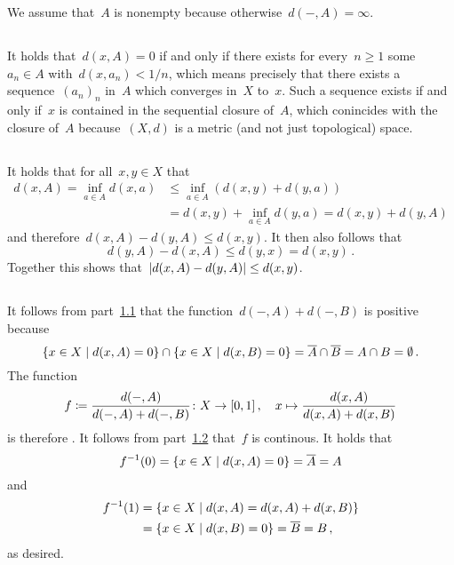 \section{}


We assume that~$A$ is nonempty because otherwise~$d(-,A) = \infty$.



\subsection{}
\label{distance for closed}

It holds that~$d(x,A) = 0$ if and only if there exists for every~$n \geq 1$ some~$a_n \in A$ with~$d(x,a_n) < 1/n$, which means precisely that there exists a sequence~$(a_n)_n$ in~$A$ which converges in~$X$ to~$x$.
Such a sequence exists if and only if~$x$ is contained in the sequential closure of~$A$, which conincides with the closure of~$A$ because~$(X,d)$ is a metric (and not just topological) space.





\subsection{}
\label{distance is lipschitz}

It holds that for all~$x, y \in X$ that
\begin{align*}
          d(x,A)
   =      \inf_{a \in A} d(x,a)
  &\leq   \inf_{a \in A} \left( d(x,y) + d(y,a) \right) \\
  &=      d(x,y) + \inf_{a \in A} d(y,a)
   =      d(x,y) + d(y,A)
\end{align*}
and therefore~$d(x,A) - d(y,A) \leq d(x,y)$.
It then also follows that 
\[
        d(y,A) - d(x,A) 
  \leq  d(y,x)
  =     d(x,y) \,.
\]
Together this shows that~$\lvert d(x,A) - d(y,A) \rvert \leq d(x,y)$.





\subsection{}

It follows from part~\ref{distance for closed} that the function~$d(-,A) + d(-,B)$ is positive because
\[
    \{x \in X \suchthat d(x,A) = 0\} \cap \{x \in X \suchthat d(x,B) = 0\}
  = \closure{A} \cap \closure{B}
  = A \cap B
  = \emptyset \,.
\]
The function
\[
            f
  \coloneqq  \frac{d(-,A)}{d(-,A) + d(-,B)}
  \colon    X
  \to       [0,1] \,,
  \quad     x
  \mapsto   \frac{d(x,A)}{d(x,A) + d(x,B)}
\]
is therefore {\welldef}.
It follows from part~\ref{distance is lipschitz} that~$f$ is continous.
It holds that
\[
    f^{-1}(0)
  = \{
      x \in X
    \suchthat
      d(x,A) = 0
    \}
  = \closure{A}
  = A
\]
and
\begin{align*}
      f^{-1}(1)
  &=  \{
        x \in X
      \suchthat
        d(x,A) = d(x,A) + d(x,B)
      \}  \\
  &=  \{
        x \in X
      \suchthat
        d(x,B) = 0
      \}
  =   \closure{B}
  =   B \,,
\end{align*}
as desired.




